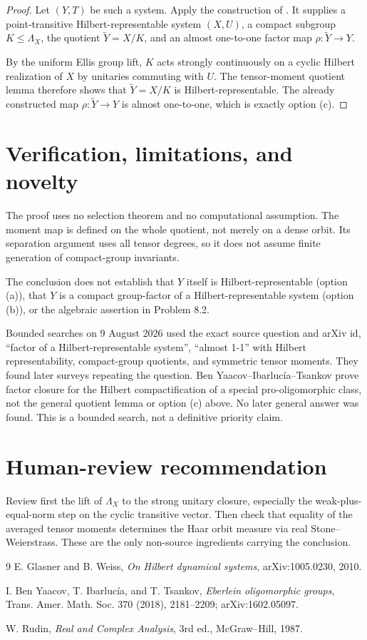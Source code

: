 \documentclass[11pt]{article}
\begin{document}
\begin{proof}
Let $(Y,T)$ be such a system.  Apply the construction of
\cite[Theorem 3.1]{GW}.  It supplies a point-transitive
Hilbert-representable system $(X,U)$, a compact subgroup
$K\leq\Lambda_X$, the quotient $\widetilde Y=X/K$, and an almost one-to-one
factor map $\rho:\widetilde Y\to Y$.

By the uniform Ellis group lift, $K$ acts strongly continuously on a cyclic
Hilbert realization of $X$ by unitaries commuting with $U$.  The tensor-moment
quotient lemma therefore shows that $\widetilde Y=X/K$ is
Hilbert-representable.  The already constructed map
$\rho:\widetilde Y\to Y$ is almost one-to-one, which is exactly option (c).
\end{proof}

\section*{Verification, limitations, and novelty}

The proof uses no selection theorem and no computational assumption.  The
moment map is defined on the whole quotient, not merely on a dense orbit.  Its
separation argument uses all tensor degrees, so it does not assume finite
generation of compact-group invariants.

The conclusion does not establish that $Y$ itself is Hilbert-representable
(option (a)), that $Y$ is a compact group-factor of a Hilbert-representable
system (option (b)), or the algebraic assertion in Problem 8.2.

Bounded searches on 9 August 2026 used the exact source question and arXiv id,
``factor of a Hilbert-representable system'', ``almost 1-1'' with Hilbert
representability, compact-group quotients, and symmetric tensor moments.  They
found later surveys repeating the question.  Ben Yaacov--Ibarluc\'ia--Tsankov
\cite{BIT} prove factor closure for the Hilbert compactification of a special
pro-oligomorphic class, not the general quotient lemma or option (c) above.  No
later general answer was found.  This is a bounded search, not a definitive
priority claim.

\section*{Human-review recommendation}

Review first the lift of $\Lambda_X$ to the strong unitary closure, especially
the weak-plus-equal-norm step on the cyclic transitive vector.  Then check that
equality of the averaged tensor moments determines the Haar orbit measure via
real Stone--Weierstrass.  These are the only non-source ingredients carrying
the conclusion.

\begin{thebibliography}{9}
E. Glasner and B. Weiss,
\emph{On Hilbert dynamical systems}, arXiv:1005.0230, 2010.

I. Ben Yaacov, T. Ibarluc\'ia, and T. Tsankov,
\emph{Eberlein oligomorphic groups},
Trans. Amer. Math. Soc. 370 (2018), 2181--2209; arXiv:1602.05097.

W. Rudin, \emph{Real and Complex Analysis}, 3rd ed.,
McGraw--Hill, 1987.
\end{thebibliography}
\end{document}
